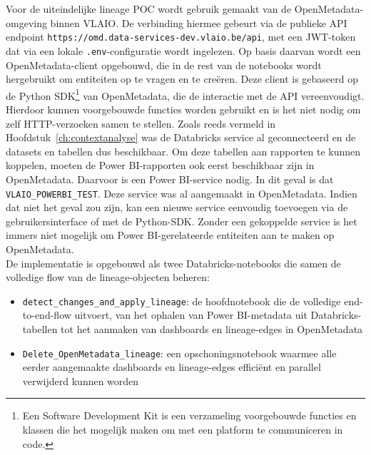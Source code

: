 Voor de uiteindelijke lineage POC wordt gebruik gemaakt van de OpenMetadata-omgeving binnen VLAIO. De verbinding hiermee gebeurt via de publieke API endpoint \texttt{https://omd.data-services-dev.vlaio.be/api}, met een JWT-token dat via een lokale \texttt{.env}-configuratie wordt ingelezen. Op basis daarvan wordt een Open\-Me\-ta\-da\-ta-client opgebouwd, die in de rest van de notebooks wordt hergebruikt om entiteiten op te vragen en te creëren. Deze client is gebaseerd op de Python SDK\footnote{Een Software Development Kit is een verzameling voorgebouwde functies en klassen die het mogelijk maken om met een platform te communiceren in code.} van OpenMetadata, die de interactie met de API vereenvoudigt. Hierdoor kunnen voorgebouwde functies worden gebruikt en is het niet nodig om zelf HTTP-verzoeken samen te stellen. Zoals reeds vermeld in Hoofdstuk~\ref{ch:contextanalyse} was de Databricks service al geconnecteerd en de datasets en tabellen dus beschikbaar. Om deze tabellen aan rapporten te kunnen koppelen, moeten de Power BI-rapporten ook eerst beschikbaar zijn in OpenMetadata. Daarvoor is een Power BI-service nodig. In dit geval is dat \texttt{VLAIO_POWERBI_TEST}. Deze service was al aangemaakt in OpenMetadata. Indien dat niet het geval zou zijn, kan een nieuwe service eenvoudig toevoegen via de gebruikersinterface of met de Python-SDK. Zonder een gekoppelde service is het immers niet mogelijk om Power BI-gerelateerde entiteiten aan te maken op OpenMetadata.\\

De implementatie is opgebouwd als twee Databricks-notebooks die samen de volledige flow van de lineage-objecten beheren:
\begin{itemize}
	\item \texttt{detect\_changes\_and\_apply\_lineage}: de hoofdnotebook die de volledige end-to-end-flow uitvoert, van het ophalen van Power BI-metadata uit Databricks-tabellen tot het aanmaken van dashboards en lineage-edges in OpenMetadata
	\item \texttt{Delete\_OpenMetadata\_lineage}: een opschoningsnotebook waarmee alle eerder aangemaakte dashboards en lineage-edges efficiënt en parallel verwijderd kunnen worden
\end{itemize}

